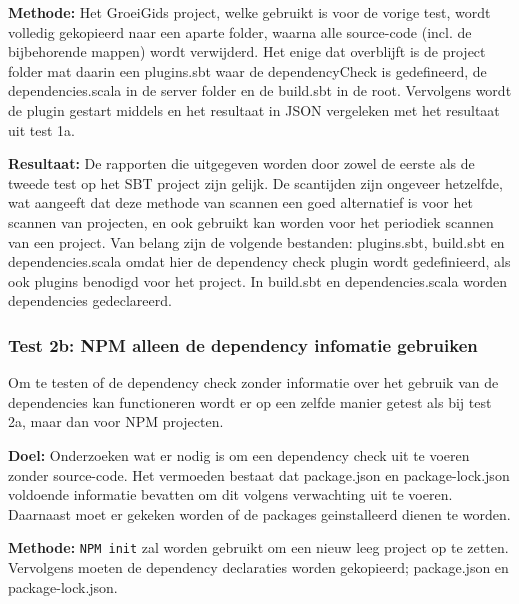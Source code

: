 \begin{itemize}

    \textbf{Methode:} Het GroeiGids project, welke gebruikt is voor de vorige test, wordt volledig gekopieerd naar een aparte folder, waarna alle source-code (incl. de bijbehorende mappen) wordt verwijderd. Het enige dat overblijft is de project folder mat daarin een plugins.sbt waar de dependencyCheck is gedefineerd, de dependencies.scala in de server folder en de build.sbt in de root. Vervolgens wordt de plugin gestart middels  en het resultaat in JSON vergeleken met het resultaat uit test 1a.

    \textbf{Resultaat:} De rapporten die uitgegeven worden door zowel de eerste als de tweede test op het SBT project zijn gelijk. De scantijden zijn ongeveer hetzelfde, wat aangeeft dat deze methode van scannen een goed alternatief is voor het scannen van projecten, en ook gebruikt kan worden voor het periodiek scannen van een project. Van belang zijn de volgende bestanden: plugins.sbt, build.sbt en dependencies.scala omdat hier de dependency check plugin wordt gedefinieerd, als ook plugins benodigd voor het project. In build.sbt en dependencies.scala worden dependencies gedeclareerd.


    \subsubsection{Test 2b: NPM alleen de dependency infomatie gebruiken}

    Om te testen of de dependency check zonder informatie over het gebruik van de dependencies kan functioneren wordt er op een zelfde manier getest als bij test 2a, maar dan voor NPM projecten.

    \textbf{Doel:} Onderzoeken wat er nodig is om een dependency check uit te voeren zonder source-code. Het vermoeden bestaat dat package.json en package-lock.json voldoende informatie bevatten om dit volgens verwachting uit te voeren. Daarnaast moet er gekeken worden of de packages geinstalleerd dienen te worden.

    \textbf{Methode:}
    \texttt{NPM init} zal worden gebruikt om een nieuw leeg project op te zetten. Vervolgens moeten de dependency declaraties worden gekopieerd; package.json en package-lock.json.


\end{itemize}
